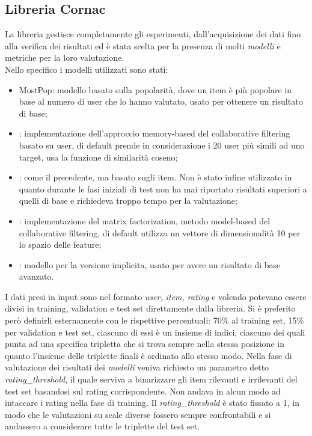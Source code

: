 \subsection{Libreria Cornac}
La libreria  gestisce completamente gli esperimenti, dall'acquisizione dei dati fino alla verifica dei risultati ed è stata scelta per la presenza di molti \textit{modelli} e metriche per la loro valutazione.\\
Nello specifico i modelli utilizzati sono stati:
\begin{itemize}
    \item MostPop: modello basato sulla popolarità, dove un item è più popolare in base al numero di user che lo hanno valutato, usato per ottenere un risultato di base;
    \item {}: implementazione dell'approccio memory-based del collaborative filtering basato su user, di default prende in considerazione i 20 user più simili ad uno target, usa la funzione di similarità coseno;
    \item {}: come il precedente, ma basato sugli item. Non è stato infine utilizzato in quanto durante le fasi iniziali di test non ha mai riportato risultati superiori a quelli di base e richiedeva troppo tempo per la valutazione;
    \item {}: implementazione del matrix factorization, metodo model-based del collaborative filtering, di default utilizza un vettore di dimensionalità 10 per lo spazio delle feature;
    \item {}: modello per la versione implicita, usato per avere un risultato di base avanzato.
\end{itemize}
I dati presi in input sono nel formato \textit{user, item, rating} e volendo potevano essere divisi in training, validation e test set direttamente dalla libreria.
Si è preferito però definirli esternamente con le rispettive percentuali: 70\% al training set, 15\% per validation e test set, ciascuno di essi è un insieme di indici, ciascuno dei quali punta ad una specifica tripletta che si trova sempre nella stessa posizione in quanto l'insieme delle triplette finali è ordinato allo stesso modo.
Nella fase di valutazione dei risultati dei \textit{modelli} veniva richiesto un parametro detto \textit{rating\_threshold}, il quale serviva a binarizzare gli item rilevanti e irrilevanti del test set basandosi sul rating corrispondente. Non andava in alcun modo ad intaccare i rating nella fase di training. Il \textit{rating\_threshold} è stato fissato a 1, in modo che le valutazioni su scale diverse fossero sempre confrontabili e si andassero a considerare tutte le triplette del test set.
 

